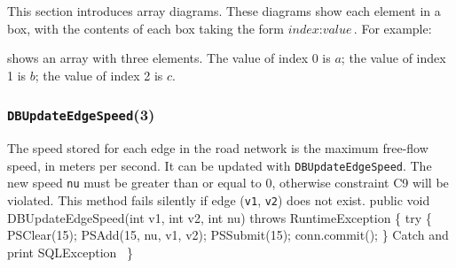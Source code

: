 \documentclass{article}
\def\nwendcode{\endtrivlist \endgroup}
\let\nwdocspar=\par
\theoremstyle{definition}
\begin{document}
This section introduces array diagrams. These diagrams show each element
in a box, with the contents of each box taking the form
$\textit{index}:\textit{value}$. For example:


\noindent shows an array with three elements. The value of index 0 is $a$; the
value of index 1 is $b$; the value of index 2 is $c$.

\subsubsection{{\tt{}\protect{}DBUpdateEdgeSpeed}(3)}
\label{sec:update-edge-speed}
The speed stored for each edge in the road network is the maximum free-flow
speed, in meters per second.  It can be updated with
{\tt{}\protect{}DBUpdateEdgeSpeed}. The new speed {\tt{}nu} must be greater than or equal to 0,
otherwise constraint C9 will be violated. This method fails silently if
edge ({\tt{}v1}, {\tt{}v2}) does not exist.
\nwenddocs{}\endmoddef{}
public void DBUpdateEdgeSpeed(int v1, int v2, int nu) throws RuntimeException \{
  try \{
    PSClear(15);
    PSAdd(15, nu, v1, v2);
    PSSubmit(15);
    conn.commit();
  \}
  \LA{}Catch and print \code{}SQLException\edoc{}~{\nwtagstyle{}}\RA{}
\}
\eatline
{}\nwendcode{}\nwdocspar
\end{document}

